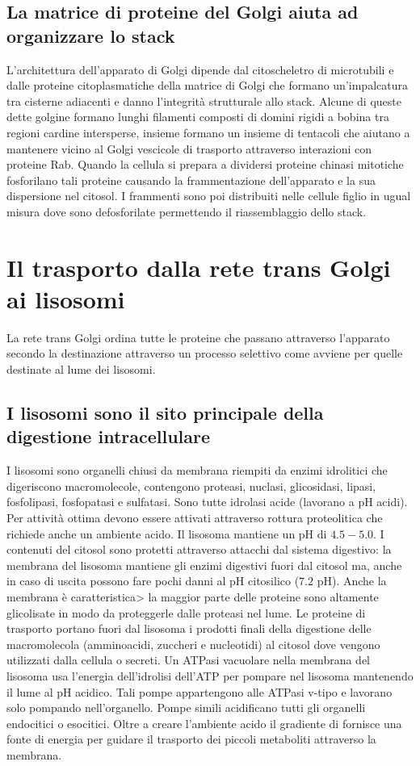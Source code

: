 \subsection{La matrice di proteine del Golgi aiuta ad organizzare lo stack}
L'architettura dell'apparato di Golgi dipende dal citoscheletro di microtubili e dalle proteine citoplasmatiche della matrice di Golgi che formano un'impalcatura tra cisterne adiacenti
e danno l'integrit\`a strutturale allo stack. Alcune di queste dette golgine formano lunghi filamenti composti di domini rigidi a bobina tra regioni cardine intersperse, insieme formano
un insieme di tentacoli che aiutano a mantenere vicino al Golgi vescicole di trasporto attraverso interazioni con proteine Rab. Quando la cellula si prepara a dividersi 
proteine chinasi mitotiche fosforilano tali proteine causando la frammentazione dell'apparato e la sua dispersione nel citosol. I frammenti sono poi distribuiti nelle cellule figlio
in ugual misura dove sono defosforilate permettendo il riassemblaggio dello stack. 
\section{Il trasporto dalla rete trans Golgi ai lisosomi}
La rete trans Golgi ordina tutte le proteine che passano attraverso l'apparato secondo la destinazione attraverso un processo selettivo come avviene per quelle destinate al lume dei 
lisosomi.
\subsection{I lisosomi sono il sito principale della digestione intracellulare}
I lisosomi sono organelli chiusi da membrana riempiti da enzimi idrolitici che digeriscono macromolecole, contengono proteasi, nuclasi, glicosidasi, lipasi, fosfolipasi, fosfopatasi e 
sulfatasi. Sono tutte idrolasi acide (lavorano a pH acidi). Per attivit\`a ottima devono essere attivati attraverso rottura proteolitica che richiede anche un ambiente acido. Il lisosoma
mantiene un pH di $4.5-5.0$. I contenuti del citosol sono protetti attraverso attacchi dal sistema digestivo: la membrana del lisosoma mantiene gli enzimi digestivi fuori dal citosol
ma, anche in caso di uscita possono fare pochi danni al pH citosilico ($7.2$ pH). Anche la membrana \`e caratteristica> la maggior parte delle proteine sono altamente glicolisate in 
modo da proteggerle dalle proteasi nel lume. Le proteine di trasporto portano fuori dal lisosoma i prodotti finali della digestione delle macromolecola (amminoacidi, zuccheri e 
nucleotidi) al citosol dove vengono utilizzati dalla cellula o secreti. Un  ATPasi vacuolare nella membrana del lisosoma usa l'energia dell'idrolisi dell'ATP per pompare 
nel lisosoma mantenendo il lume al pH acidico. Tali pompe appartengono alle ATPasi v-tipo e lavorano solo pompando  nell'organello. Pompe simili acidificano tutti gli organelli
endocitici o esocitici. Oltre a creare l'ambiente acido il gradiente di  fornisce una fonte di energia per guidare il trasporto dei piccoli metaboliti attraverso la membrana. 
